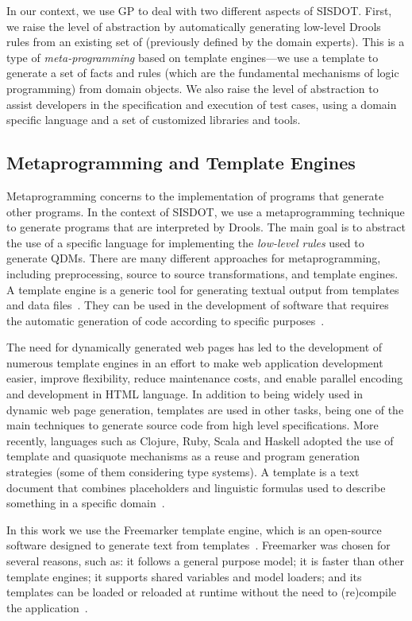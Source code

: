 In our context, we use GP to deal with two different aspects of SISDOT. First, 
we raise the level of abstraction by automatically generating low-level Drools 
rules from an existing set of \callers (previously defined by the domain experts). 
This is a type of \emph{meta-programming} based on template engines---we use a 
template to generate a set of facts and rules (which are the fundamental mechanisms of 
logic programming) from domain objects. We also raise the level of abstraction to 
assist developers in the specification and execution of test cases, using a 
domain specific language and a set of customized libraries and tools.  


\subsection{Metaprogramming and Template Engines}

Metaprogramming concerns to the implementation of programs that 
generate other programs. In the context of SISDOT, we use a metaprogramming 
technique to generate programs that are interpreted by Drools. The main goal 
is to abstract the use of a specific language for implementing the 
\emph{low-level rules} used to generate QDMs. There are many different 
approaches for metaprogramming, including preprocessing, source to source 
transformations, and template engines. 
A template engine is a generic tool for generating textual output from templates and data 
files~\cite{he2009}. They can be used 
in the development of software that requires the automatic generation of code 
according to specific purposes~\cite{benato2017}. 

The need for dynamically generated web pages has led to the development of numerous template engines 
in an effort to make web application development easier, improve flexibility, 
reduce maintenance costs, and enable parallel encoding and development in HTML language. 
In addition to being widely used in dynamic web page generation, templates are used in other tasks, 
being one of the main techniques to generate source code from high level specifications. More 
recently, languages such as Clojure, Ruby, Scala and Haskell adopted the use of template and quasiquote 
mechanisms as a reuse and program generation strategies (some of them considering type systems).
A template is a text document that 
combines placeholders and linguistic formulas used to describe something in a specific domain~\cite{arnoldus2007,segura2017}. 

In this work we use the Freemarker template engine, which is an open-source software designed to 
generate text from templates~\cite{radjenovic2009}. Freemarker was chosen for several reasons, 
such as: it follows a general purpose model; it is faster than other template engines; it supports 
shared variables and model loaders; and its templates can be loaded or reloaded at runtime without the 
need to (re)compile the application~\cite{benato2017,parr2006}.

